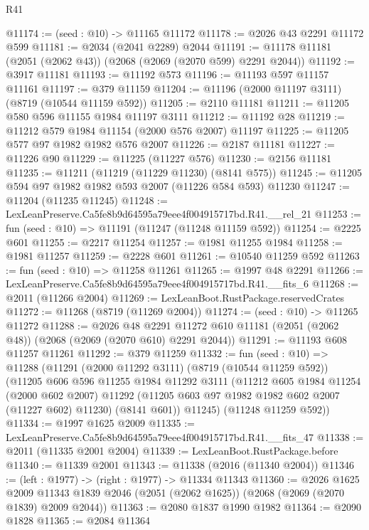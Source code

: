 \begin{lexlean}{R41}
\begin{coremodule}
@11174 := (seed : @10) -> @11165 @11172
@11178 := @2026 @43 @2291 @11172 @599
@11181 := @2034 (@2041 @2289) @2044
@11191 := @11178 @11181 (@2051 (@2062 @43)) (@2068 (@2069 (@2070 @599) @2291 @2044))
@11192 := @3917 @11181
@11193 := @11192 @573
@11196 := @11193 @597 @11157 @11161
@11197 := @379 @11159
@11204 := @11196 (@2000 @11197 @3111) (@8719 (@10544 @11159 @592))
@11205 := @2110 @11181
@11211 := @11205 @580 @596 @11155 @1984 @11197 @3111
@11212 := @11192 @28
@11219 := @11212 @579 @1984 @11154 (@2000 @576 @2007) @11197
@11225 := @11205 @577 @97 @1982 @1982 @576 @2007
@11226 := @2187 @11181
@11227 := @11226 @90
@11229 := @11225 (@11227 @576)
@11230 := @2156 @11181
@11235 := @11211 (@11219 (@11229 @11230) (@8141 @575))
@11245 := @11205 @594 @97 @1982 @1982 @593 @2007 (@11226 @584 @593) @11230
@11247 := @11204 (@11235 @11245)
@11248 := LexLeanPreserve.Ca5fe8b9d64595a79eee4f004915717bd.R41.__rel_21
@11253 := fun (seed : @10) => @11191 (@11247 (@11248 @11159 @592))
@11254 := @2225 @601
@11255 := @2217 @11254
@11257 := @1981 @11255 @1984
@11258 := @1981 @11257
@11259 := @2228 @601
@11261 := @10540 @11259 @592
@11263 := fun (seed : @10) => @11258 @11261
@11265 := @1997 @48 @2291
@11266 := LexLeanPreserve.Ca5fe8b9d64595a79eee4f004915717bd.R41.__fits_6
@11268 := @2011 (@11266 @2004)
@11269 := LexLeanBoot.RustPackage.reservedCrates
@11272 := @11268 (@8719 (@11269 @2004))
@11274 := (seed : @10) -> @11265 @11272
@11288 := @2026
    @48
    @2291
    @11272
    @610
    @11181
    (@2051 (@2062 @48))
    (@2068 (@2069 (@2070 @610) @2291 @2044))
@11291 := @11193 @608 @11257 @11261
@11292 := @379 @11259
@11332 := fun (seed : @10) =>
  @11288
    (@11291
      (@2000 @11292 @3111)
      (@8719 (@10544 @11259 @592))
      (@11205
        @606
        @596
        @11255
        @1984
        @11292
        @3111
        (@11212
          @605
          @1984
          @11254
          (@2000 @602 @2007)
          @11292
          (@11205 @603 @97 @1982 @1982 @602 @2007 (@11227 @602) @11230)
          (@8141 @601))
        @11245)
      (@11248 @11259 @592))
@11334 := @1997 @1625 @2009
@11335 := LexLeanPreserve.Ca5fe8b9d64595a79eee4f004915717bd.R41.__fits_47
@11338 := @2011 (@11335 @2001 @2004)
@11339 := LexLeanBoot.RustPackage.before
@11340 := @11339 @2001
@11343 := @11338 (@2016 (@11340 @2004))
@11346 := (left : @1977) -> (right : @1977) -> @11334 @11343
@11360 := @2026
    @1625
    @2009
    @11343
    @1839
    @2046
    (@2051 (@2062 @1625))
    (@2068 (@2069 (@2070 @1839) @2009 @2044))
@11363 := @2080 @1837 @1990 @1982
@11364 := @2090 @1828
@11365 := @2084 @11364

\end{coremodule}
\end{lexlean}
